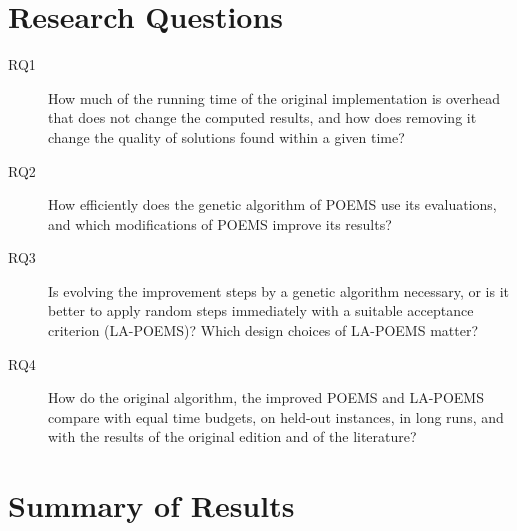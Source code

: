 \section{Research Questions}

\begin{description}
\item[RQ1] How much of the running time of the original implementation is overhead that does not change the computed results, and how does removing it change the quality of solutions found within a given time?
\item[RQ2] How efficiently does the genetic algorithm of POEMS use its evaluations, and which modifications of POEMS improve its results?
\item[RQ3] Is evolving the improvement steps by a genetic algorithm necessary, or is it better to apply random steps immediately with a suitable acceptance criterion (LA-POEMS)? Which design choices of LA-POEMS matter?
\item[RQ4] How do the original algorithm, the improved POEMS and LA-POEMS compare with equal time budgets, on held-out instances, in long runs, and with the results of the original edition and of the literature?
\end{description}

\section{Summary of Results}

